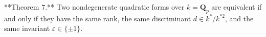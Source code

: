 **Theorem 7.** Two nondegenerate quadratic forms over $k = \mathbf{Q}_p$ are equivalent if and only if they have the same rank, the same discriminant $d \in k^*/k^{*2}$, and the same invariant $\varepsilon \in \{\pm 1\}$.
